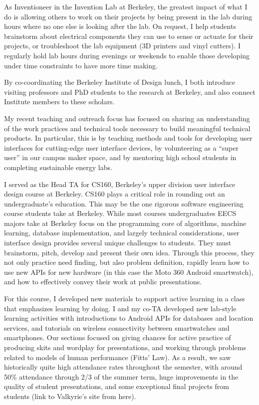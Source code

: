 \documentclass[12pt]{memoir}
\begin{document}
As Inventioneer in the Invention Lab at Berkeley, the greatest impact of what I do is allowing others to work on their projects by being present in the lab during hours where no one else is looking after the lab.
On request, I help students brainstorm about electrical components they can use to sense or actuate for their projects, or troubleshoot the lab equipment (3D printers and vinyl cutters).
I regularly hold lab hours during evenings or weekends to enable those developing under time constraints to have more time making.

By co-coordinating the Berkeley Institute of Design lunch, I both introduce visiting professors and PhD students to the research at Berkeley, and also connect Institute members to these scholars.

My recent teaching and outreach focus has focused on sharing an understanding of the work practices and technical tools necessary to build meaningful technical products.
In particular, this is by teaching methods and tools for developing user interfaces for cutting-edge user interface devices, by volunteering as a ``super user'' in our campus maker space, and by mentoring high school students in completing sustainable energy labs.

I served as the Head TA for CS160, Berkeley's upper division user interface design course at Berkeley.
CS160 plays a critical role in rounding out an undergraduate's education.
This may be the one rigorous software engineering course students take at Berkeley.
While most courses undergraduates EECS majors take at Berkeley focus on the programming core of algorithms, machine learning, database implementation, and largely technical considerations, user interface design provides several unique challenges to students.
They must brainstorm, pitch, develop and present their own idea.
Through this process, they not only practice need finding, but also problem definition, rapidly learn how to use new APIs for new hardware (in this case the Moto 360 Android smartwatch), and how to effectively convey their work at public presentations.

For this course, I developed new materials to support active learning in a class that emphasizes learning by doing.
I and my co-TA developed new lab-style learning activities with introductions to Android APIs for databases and location services, and tutorials on wireless connectivity between smartwatches and smartphones.
Our sections focused on giving chances for active practice of producing skits and wordplay for presentations, and working through problems related to models of human performance (Fitts' Law).
As a result, we saw historically quite high attendance rates throughout the semester, with around 50\% attendance through 2/3 of the summer term, huge improvements in the quality of student presentations, and some exceptional final projects from students (link to Valkyrie's site from here).
\end{document}
